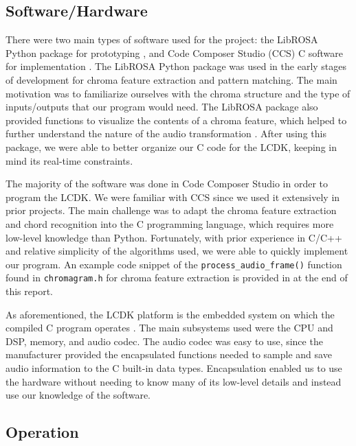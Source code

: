 \documentclass[journal]{IEEEtran}
\begin{document}
\subsection{Software/Hardware}
There were two main types of software used for the project: the LibROSA Python package for prototyping \cite{librosa}, and Code Composer Studio (CCS) C software for implementation \cite{ccs}.
The LibROSA Python package was used in the early stages of development for chroma feature extraction and pattern matching.
The main motivation was to familiarize ourselves with the chroma structure and the type of inputs/outputs that our program would need.
The LibROSA package also provided functions to visualize the contents of a chroma feature, which helped to further understand the nature of the audio transformation \cite{librosa}.
After using this package, we were able to better organize our C code for the LCDK, keeping in mind its real-time constraints.

The majority of the software was done in Code Composer Studio in order to program the LCDK.
We were familiar with CCS since we used it extensively in prior projects.
The main challenge was to adapt the chroma feature extraction and chord recognition into the C programming language, which requires more low-level knowledge than Python.
Fortunately, with prior experience in C/C++ and relative simplicity of the algorithms used, we were able to quickly implement our program.
An example code snippet of the \texttt{process\_audio\_frame()} function found in \texttt{chromagram.h} for chroma feature extraction is provided in  at the end of this report.

As aforementioned, the LCDK platform is the embedded system on which the compiled C program operates \cite{lcdk}.
The main subsystems used were the CPU and DSP, memory, and audio codec.
The audio codec was easy to use, since the manufacturer provided the encapsulated functions needed to sample and save audio information to the C built-in data types.
Encapsulation enabled us to use the hardware without needing to know many of its low-level details and instead use our knowledge of the software.


\subsection{Operation}
\end{document}
